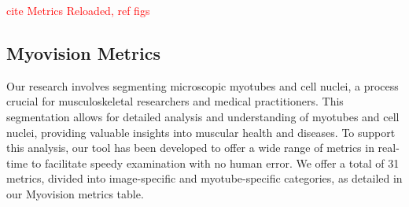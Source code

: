 \textcolor{red}{cite Metrics Reloaded, ref figs}

\subsection{Myovision Metrics}
Our research involves segmenting microscopic myotubes and cell nuclei, a process crucial for musculoskeletal researchers and medical practitioners. This segmentation allows for detailed analysis and understanding of myotubes and cell nuclei, providing valuable insights into muscular health and diseases. To support this analysis, our tool has been developed to offer a wide range of metrics in real-time to facilitate speedy examination with no human error. We offer a total of 31 metrics, divided into image-specific and myotube-specific categories, as detailed in our Myovision metrics table.
